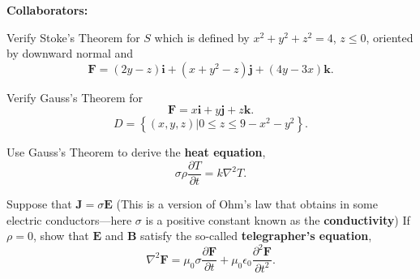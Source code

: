 \documentclass[11pt,letterpaper,boxed]{hmcpset}
\newcommand{\crb}[1]{\left\{ #1 \right\}}
\newcommand{\pdr}[2]{\frac{\partial #1}{\partial #2}}
\newcommand{\pdrr}[2]{\frac{\partial^2 #1}{\partial #2^2}}
\newcommand{\VEC}[1]{\ensuremath{\mathbf{#1}}\xspace}
\begin{document}
\noindent\textbf{Collaborators:} 


\begin{problem}[Colley 7.3 \#4]
Verify Stoke's Theorem for $S$ which is defined by $x^2+y^2+z^2=4$, $z\leq0$, oriented by downward normal and 
\[
	\VEC{F} = (2y-z)\VEC{i}+(x+y^2-z)\VEC{j}+(4y-3x)\VEC{k}.
\]
\end{problem}

\begin{solution}
\vfill
\end{solution}
\newpage

\begin{problem}[Colley 7.3 \#6]
Verify Gauss's Theorem for
\[
	\VEC{F} = x\VEC{i}+y\VEC{j}+z\VEC{k}.
\]
\[
	D = \crb{(x,y,z)|0\leq z\leq9-x^2-y^2}.
\]
\end{problem}

\begin{solution}
\vfill
\end{solution}
\newpage

\begin{problem}[Colley 7.4 \#6]
Use Gauss's Theorem to derive the \textbf{heat equation},
\[
	\sigma \rho \pdr{T}{t} = k \nabla^2T.
\]
\end{problem}

\begin{solution}
\vfill
\end{solution}
\newpage

\begin{problem}[Colley 7.4 \#10]

\end{problem}

\begin{solution}
\vfill
\end{solution}
\newpage

\begin{problem}[Colley 7.4 \#18	]
Suppose that $\VEC{J} = \sigma\VEC{E}$ (This is a version of Ohm's law that obtains in some electric conductors---here
$\sigma$ is a positive constant known as the \textbf{conductivity}) If $\rho=0$, show that $\VEC{E}$ and $\VEC{B}$ satisfy the so-called
\textbf{telegrapher's equation},
\[
	\nabla^2\VEC{F} = \mu_0\sigma\pdr{\VEC{F}}{t}+\mu_0\epsilon_0\pdrr{\VEC{F}}{t}.
\]
\end{problem}

\begin{solution}
\vfill
\end{solution}
\newpage
\end{document}
